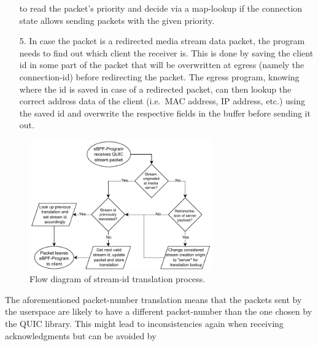 \begin{enumerate}
                        to read the packet's priority and decide via a map-lookup if the connection 
                        state allows sending packets with the given priority.
    \item[5.] In case the packet is a redirected media stream data packet, the program needs to find out 
            which client the receiver is. 
            This is done by saving the client id in some part of the packet that will be 
            overwritten at egress (namely the connection-id) before redirecting the packet.
            The egress program, knowing where the id is saved in case of a redirected packet, can then
            lookup the correct address data of the client (i.e.~MAC address, IP address, etc.) using 
            the saved id and overwrite the respective fields in the buffer before sending it out.
\end{enumerate}
\vspace{0.5cm}
\begin{figure}[H]
    \centering
    \includegraphics[width=0.7\textwidth]{figures/03_fast_relays/stream-id-translation.drawio.pdf}
    \caption[Stream-id translation schematic]{Flow diagram of stream-id translation process.}\label{fig:stream-id-translation}
\end{figure}
The aforementioned packet-number translation means that the packets sent by the userspace are 
likely to have a different packet-number than the one chosen by the QUIC library.
This might lead to inconsistencies again when receiving acknowledgments but can be avoided by 
